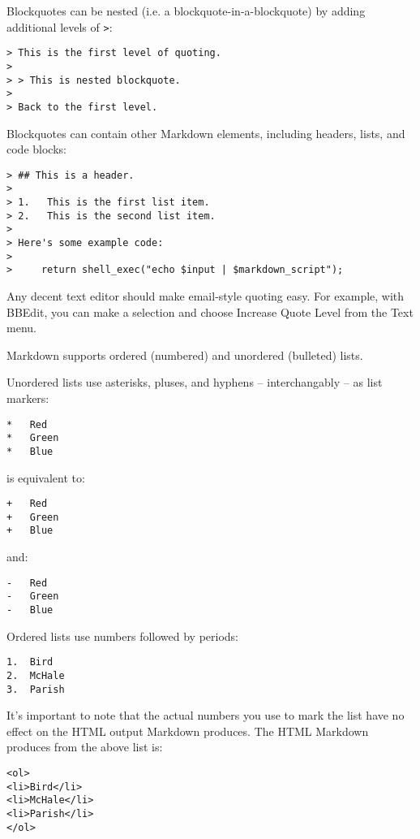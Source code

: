 Blockquotes can be nested (i.e. a blockquote-in-a-blockquote) by
adding additional levels of \texttt{>}:

\begin{verbatim}
> This is the first level of quoting.
>
> > This is nested blockquote.
>
> Back to the first level.
\end{verbatim}

Blockquotes can contain other Markdown elements, including headers, lists,
and code blocks:

\begin{verbatim}
> ## This is a header.
> 
> 1.   This is the first list item.
> 2.   This is the second list item.
> 
> Here's some example code:
> 
>     return shell_exec("echo $input | $markdown_script");
\end{verbatim}

Any decent text editor should make email-style quoting easy. For
example, with BBEdit, you can make a selection and choose Increase
Quote Level from the Text menu.

Markdown supports ordered (numbered) and unordered (bulleted) lists.

Unordered lists use asterisks, pluses, and hyphens -- interchangably
-- as list markers:

\begin{verbatim}
*   Red
*   Green
*   Blue
\end{verbatim}

is equivalent to:

\begin{verbatim}
+   Red
+   Green
+   Blue
\end{verbatim}

and:

\begin{verbatim}
-   Red
-   Green
-   Blue
\end{verbatim}

Ordered lists use numbers followed by periods:

\begin{verbatim}
1.  Bird
2.  McHale
3.  Parish
\end{verbatim}

It's important to note that the actual numbers you use to mark the
list have no effect on the HTML output Markdown produces. The HTML
Markdown produces from the above list is:

\begin{verbatim}
<ol>
<li>Bird</li>
<li>McHale</li>
<li>Parish</li>
</ol>
\end{verbatim}

